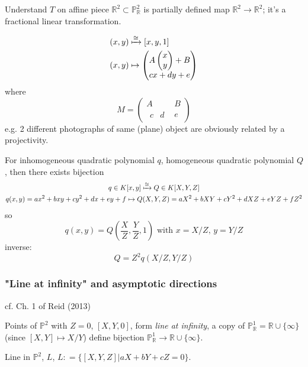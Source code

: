 Understand $T$ on affine piece $\mathbb{R}^2 \subset \mathbb{P}^2_{\mathbb{R}}$ is partially defined map $\mathbb{R}^2 \to \mathbb{R}^2$; it's a fractional linear transformation.

\[
\begin{gathered}
	\begin{aligned}
	& (x,y) \xmapsto{\cong} [x,y, 1] \\
	& (x,y) \mapsto \left( \begin{matrix} A \left( \begin{matrix} x \\ y \end{matrix} \right) + B \\ cx + dy + e \end{matrix} \right) 
	\end{aligned}
\end{gathered}
\]
where 
\[
M = \left( \begin{array}{c|c} A & B \\ \begin{matrix} c & d \end{matrix} & e \end{array} \right) 
\]
e.g. 2 different photographs of same (plane) object are obviously related by a projectivity.

For inhomogeneous quadratic polynomial $q$, homogeneous quadratic polynomial $Q$, then there exists bijection
\[
\begin{gathered}
	q \in K[x,y] \xmapsto{\cong} Q \in K[X,Y,Z] \\
	q(x,y) = ax^2 + bxy + cy^2 + dx + ey + f \mapsto Q(X,Y,Z) = aX^2 + bXY + cY^2 + dXZ + eYZ + fZ^2 
\end{gathered}
\]
so
\[
q(x,y) = Q\left( \frac{X}{Z} , \frac{Y}{Z} , 1 \right) \text{ with } x= X/Z, \, y = Y/Z
\]
inverse:
\[
Q = Z^2 q(X/Z, Y/Z)
\]


\subsubsection{"Line at infinity" and asymptotic directions}

cf. Ch. 1 of Reid (2013)

Points of $\mathbb{P}^2$ with $Z=0$, $[X,Y,0]$, form \emph{line at infinity}, a copy of $\mathbb{P}^1_{\mathbb{R}} = \mathbb{R} \cup \lbrace \infty \rbrace$ (since $[X,Y] \mapsto X/Y$) define bijection $\mathbb{P}^1_{\mathbb{R}} \to \mathbb{R} \cup \lbrace \infty \rbrace$. 

Line in $\mathbb{P}^2$, $L$, $L: = \lbrace [ X, Y,Z] | aX + bY + cZ = 0 \rbrace$. 

